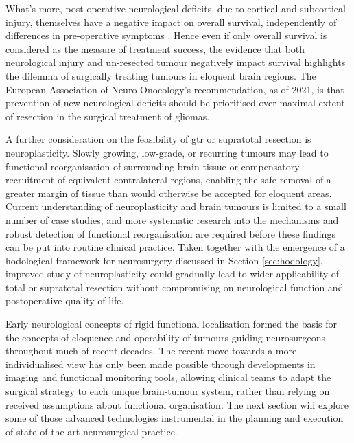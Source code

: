 What's more, post-operative neurological deficits, due to cortical and subcortical injury, themselves have a negative impact on overall survival, independently of differences in pre-operative symptoms \autocite{Trinh2013,Rahman2016,Rincon-Torroella2019}.
Hence even if only overall survival is considered as the measure of treatment success, the evidence that both neurological injury and un-resected tumour negatively impact survival highlights the dilemma of surgically treating tumours in eloquent brain regions\autocite{Rincon-Torroella2019,Duffau2004,Rahman2016}.
The European Association of Neuro-Onocology's recommendation, as of 2021, is that prevention of new neurological deficits should be prioritised over maximal extent of resection in the surgical treatment of gliomas\autocite{Weller2021}.

A further consideration on the feasibility of \gls{gtr} or supratotal resection is neuroplasticity\autocite{Duffau2005}.
Slowly growing, low-grade, or recurring tumours may lead to functional reorganisation of surrounding brain tissue\autocite{Takahashi2012,Southwell2016,Das2019} or compensatory recruitment of equivalent contralateral regions\autocite{Mitolo2022}, enabling the safe removal of a greater margin of tissue than would otherwise be accepted for eloquent areas\autocite{Rossi2019a}.
Current understanding of neuroplasticity and brain tumours is limited to a small number of case studies, and more systematic research into the mechanisms and robust detection of functional reorganisation are required before these findings can be put into routine clinical practice\autocite{Duffau2005,Abel2015,Satoer2017}.
Taken together with the emergence of a hodological framework for neurosurgery discussed in Section \ref{sec:hodology}\autocite{Sala2019}, improved study of neuroplasticity could gradually lead to wider applicability of total or supratotal resection without compromising on neurological function and postoperative quality of life.

Early neurological concepts of rigid functional localisation formed the basis for the concepts of eloquence and operability of tumours guiding neurosurgeons throughout much of recent decades.
The recent move towards a more individualised view has only been made possible through developments in imaging and functional monitoring tools, allowing clinical teams to adapt the surgical strategy to each unique brain-tumour system, rather than relying on received assumptions about functional organisation\autocite{Boerger2023}.
The next section will explore some of those advanced technologies instrumental in the planning and execution of state-of-the-art neurosurgical practice.

